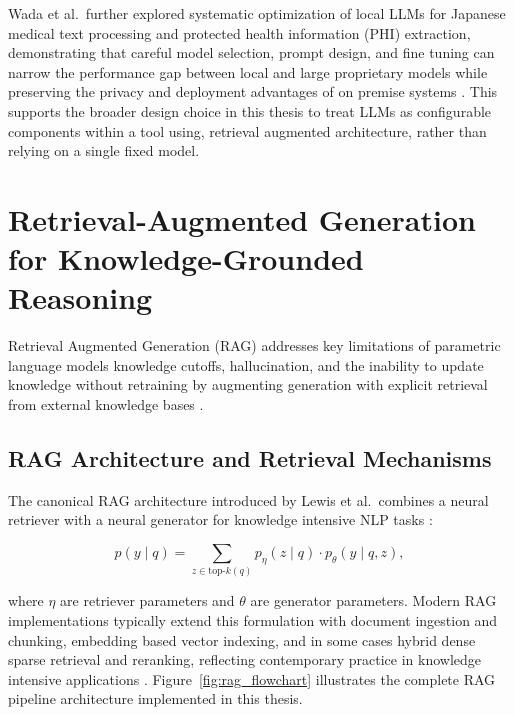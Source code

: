 \documentclass[12pt,a4paper]{report}
\begin{document}
	Wada et al.\ further explored systematic optimization of local LLMs for Japanese
	medical text processing and protected health information (PHI) extraction,
	demonstrating that careful model selection, prompt design, and fine tuning can
	narrow the performance gap between local and large proprietary models while
	preserving the privacy and deployment advantages of on premise systems
	\cite{Wada2026LocalLLMOptimization}. This supports the broader design choice in
	this thesis to treat LLMs as configurable components within a tool using,
	retrieval augmented architecture, rather than relying on a single fixed model.
	
	
	
	\section{Retrieval-Augmented Generation for Knowledge-Grounded Reasoning}
	\label{sec:rag}
	
	Retrieval Augmented Generation (RAG) addresses key limitations of parametric
	language models knowledge cutoffs, hallucination, and the inability to update
	knowledge without retraining by augmenting generation with explicit retrieval
	from external knowledge bases \cite{lewis2020retrieval}.
	
	\subsection{RAG Architecture and Retrieval Mechanisms}
	
	The canonical RAG architecture introduced by Lewis et al.\ combines a neural
	retriever with a neural generator for knowledge intensive NLP tasks
	\cite{lewis2020retrieval}:
	
	\begin{equation}
		p(y \mid q)
		= \sum_{z \in \text{top-}k(q)} p_\eta(z \mid q) \cdot p_\theta(y \mid q, z),
	\end{equation}
	
	where $\eta$ are retriever parameters and $\theta$ are generator parameters.
	Modern RAG implementations typically extend this formulation with document
	ingestion and chunking, embedding based vector indexing, and in some cases
	hybrid dense sparse retrieval and reranking, reflecting contemporary practice in
	knowledge intensive applications \cite{lewis2020retrieval,firoozi2025rag_dentistry,xu2025mega_rag}. Figure~\ref{fig:rag_flowchart} illustrates the complete RAG pipeline architecture implemented in this thesis.
	
\end{document}
